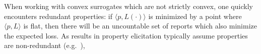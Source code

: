 \documentclass[12pt]{article}
\newcommand{\Comments}{1}
\newcommand{\mynote}[2]{\ifnum\Comments=1\textcolor{#1}{#2}\fi}
\newcommand{\mytodo}[2]{\ifnum\Comments=1%
  \todo[linecolor=#1!80!black,backgroundcolor=#1,bordercolor=#1!80!black]{#2}\fi}
\newcommand{\raft}[1]{\mytodo{green!20!white}{RF: #1}}
\newcommand{\jessie}[1]{\mynote{teal}{[JF: #1]}}
\newcommand{\reals}{\mathbb{R}}
\newcommand{\simplex}{\Delta_\Y}
\newcommand{\R}{\mathcal{R}}
\newcommand{\Y}{\mathcal{Y}}
\newcommand{\risk}[1]{\underline{#1}}
\newcommand{\inprod}[2]{\langle #1, #2 \rangle}%
\DeclareMathOperator*{\argmin}{arg\,min}
\begin{document}
%	


When working with convex surrogates which are not strictly convex, one quickly encounters redundant properties: if $\inprod{p}{L(\cdot)}$ is minimized by a point where $\inprod{p}{L}$ is flat, then there will be an uncountable set of reports which also minimize the expected loss.
As results in property elicitation typically assume properties are non-redundant (e.g.~\cite{frongillo2014general,frongillo2015elicitation}), 
\end{document}
